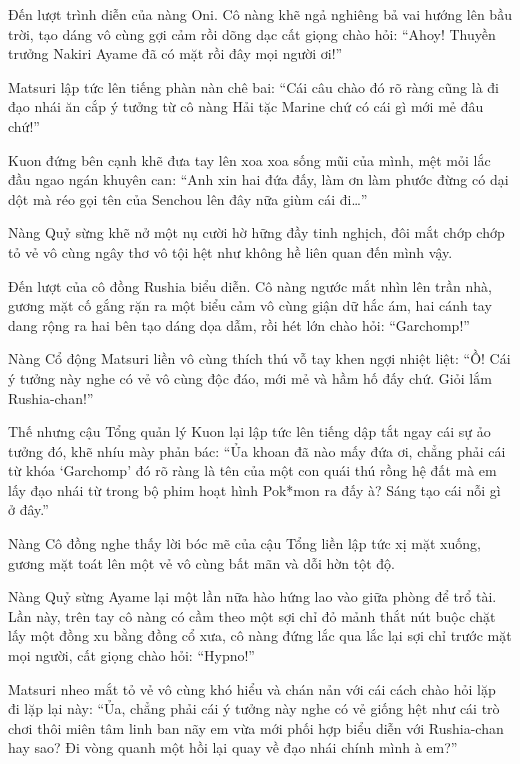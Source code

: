\documentclass[../main.tex]{subfiles}
\begin{document}
Đến lượt trình diễn của nàng Oni. Cô nàng khẽ ngả nghiêng bả vai hướng lên bầu trời, tạo dáng vô cùng gợi cảm rồi dõng dạc cất giọng chào hỏi: ``Ahoy! Thuyền trưởng Nakiri Ayame đã có mặt rồi đây mọi người ơi!''

Matsuri lập tức lên tiếng phàn nàn chê bai: ``Cái câu chào đó rõ ràng cũng là đi đạo nhái ăn cắp ý tưởng từ cô nàng Hải tặc Marine chứ có cái gì mới mẻ đâu chứ!''

Kuon đứng bên cạnh khẽ đưa tay lên xoa xoa sống mũi của mình, mệt mỏi lắc đầu ngao ngán khuyên can: ``Anh xin hai đứa đấy, làm ơn làm phước đừng có dại dột mà réo gọi tên của Senchou lên đây nữa giùm cái đi\dots''

Nàng Quỷ sừng khẽ nở một nụ cười hờ hững đầy tinh nghịch, đôi mắt chớp chớp tỏ vẻ vô cùng ngây thơ vô tội hệt như không hề liên quan đến mình vậy.

\ct

Đến lượt của cô đồng Rushia biểu diễn. Cô nàng ngước mắt nhìn lên trần nhà, gương mặt cố gắng rặn ra một biểu cảm vô cùng giận dữ hắc ám, hai cánh tay dang rộng ra hai bên tạo dáng dọa dẫm, rồi hét lớn chào hỏi: ``Garchomp!''

Nàng Cổ động Matsuri liền vô cùng thích thú vỗ tay khen ngợi nhiệt liệt: ``Ồ! Cái ý tưởng này nghe có vẻ vô cùng độc đáo, mới mẻ và hầm hố đấy chứ. Giỏi lắm Rushia-chan!''

Thế nhưng cậu Tổng quản lý Kuon lại lập tức lên tiếng dập tắt ngay cái sự ảo tưởng đó, khẽ nhíu mày phản bác: ``Ủa khoan đã nào mấy đứa ơi, chẳng phải cái từ khóa `Garchomp' đó rõ ràng là tên của một con quái thú rồng hệ đất mà em lấy đạo nhái từ trong bộ phim hoạt hình Pok*mon ra đấy à? Sáng tạo cái nỗi gì ở đây.''

Nàng Cô đồng nghe thấy lời bóc mẽ của cậu Tổng liền lập tức xị mặt xuống, gương mặt toát lên một vẻ vô cùng bất mãn và dỗi hờn tột độ.

\ct

Nàng Quỷ sừng Ayame lại một lần nữa hào hứng lao vào giữa phòng để trổ tài. Lần này, trên tay cô nàng có cầm theo một sợi chỉ đỏ mảnh thắt nút buộc chặt lấy một đồng xu bằng đồng cổ xưa, cô nàng đứng lắc qua lắc lại sợi chỉ trước mặt mọi người, cất giọng chào hỏi: ``Hypno!''

Matsuri nheo mắt tỏ vẻ vô cùng khó hiểu và chán nản với cái cách chào hỏi lặp đi lặp lại này: ``Ủa, chẳng phải cái ý tưởng này nghe có vẻ giống hệt như cái trò chơi thôi miên tâm linh ban nãy em vừa mới phối hợp biểu diễn với Rushia-chan hay sao? Đi vòng quanh một hồi lại quay về đạo nhái chính mình à em?''
\end{document}
